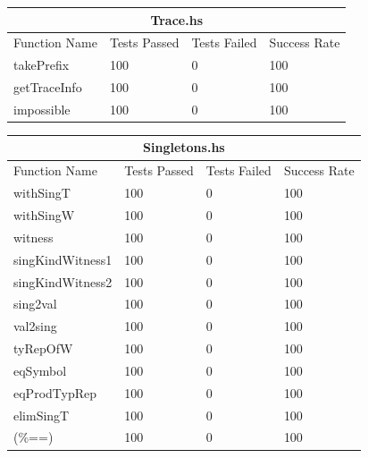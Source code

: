 \documentclass[12pt, svgnames]{article}
\begin{document}
\begin{adjustwidth}{-0.5cm}{}    
    \begin{tabular}[h!]{ |p{5cm}||p{3cm}|p{3cm}|p{3cm}|  }
        
        \hline
        \multicolumn{4}{|c|}{Trace.hs} \\
        \hline
        Function Name & Tests Passed & Tests Failed & Success Rate\\
        \hline
        takePrefix   & 100    &0&   100\\
        getTraceInfo&   100  & 0   &100\\
        impossible & 100 & 0&  100\\
        \hline
    \end{tabular}
\end{adjustwidth}

\begin{adjustwidth}{-0.5cm}{}    
    \begin{tabular}[h!]{ |p{5cm}||p{3cm}|p{3cm}|p{3cm}|  }      
        \hline
        \multicolumn{4}{|c|}{Singletons.hs} \\
        \hline
        Function Name & Tests Passed & Tests Failed & Success Rate\\
        \hline
        withSingT   & 100    &0&   100\\
        withSingW&   100  & 0   &100\\
        witness &100 & 0&  100\\
        singKindWitness1 &100 & 0&  100\\
        singKindWitness2 &   100  & 0&100\\
        sing2val & 100  & 0   &100\\
        val2sing& 100  & 0&100\\
        tyRepOfW& 100  & 0&100\\
        eqSymbol& 100  & 0&100\\
        eqProdTypRep& 100  & 0& 100\\
        elimSingT& 100  & 0&100\\
        (\%==) & 100  & 0&100\\
        \hline
    \end{tabular}
\end{adjustwidth}
\end{document}
